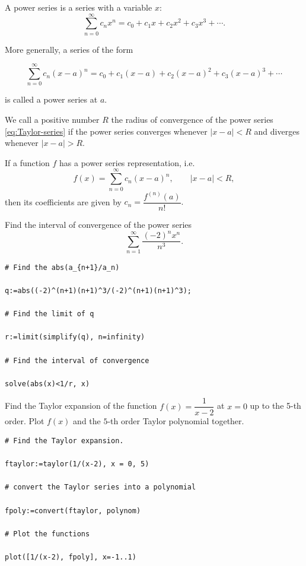\documentclass[en,11pt,simple]{elegantbook}
\let\BeginKnitrBlock\begin \let\EndKnitrBlock\end
\begin{document}
A power series is a series with a variable \(x\):
\[
\sum\limits_{n=0}^{\infty} c_nx^n=c_0+c_1x+c_2x^2+c_3x^3+\cdots.
\]

More generally, a series of the form

\begin{equation}
\sum\limits_{n=0}^{\infty} c_n(x-a)^n=c_0+c_1(x-a)+c_2(x-a)^2+c_3(x-a)^3+\cdots
\label{eq:Taylor-series}
\end{equation}

is called a power series at \(a\).

We call a positive number \(R\) the radius of convergence of the power series \eqref{eq:Taylor-series} if the power series converges whenever \(\left|x-a\right|<R\) and diverges whenever \(\left|x-a\right|>R\).

If a function \(f\) has a power series representation, i.e.
\[
f(x)=\sum_{n=0}^\infty c_n(x-a)^n,\quad\quad \left|x-a\right|<R,
\]
then its coefficients are given by \(c_n=\dfrac{f^{(n)}(a)}{n!}.\)

\BeginKnitrBlock{example}{}{}
\protect\hypertarget{exm:unnamed-chunk-230}{}{\label{exm:unnamed-chunk-230} }
Find the interval of convergence of the power series
\[
\sum\limits_{n=1}^{\infty}\dfrac{(-2)^nx^n}{n^3}.
\]
\EndKnitrBlock{example}

\BeginKnitrBlock{solution}{}{}
{}

\begin{verbatim}
# Find the abs(a_{n+1}/a_n)

q:=abs((-2)^(n+1)(n+1)^3/(-2)^(n+1)(n+1)^3);

# Find the limit of q

r:=limit(simplify(q), n=infinity)

# Find the interval of convergence

solve(abs(x)<1/r, x)
\end{verbatim}
\EndKnitrBlock{solution}

\BeginKnitrBlock{example}{}{}
\protect\hypertarget{exm:unnamed-chunk-232}{}{\label{exm:unnamed-chunk-232} }
Find the Taylor expansion of the function \(f(x)=\dfrac{1}{x-2}\) at \(x=0\) up to the 5-th order. Plot \(f(x)\) and the \(5\)-th order Taylor polynomial together.
\EndKnitrBlock{example}

\BeginKnitrBlock{solution}{}{}
{}

\begin{verbatim}
# Find the Taylor expansion.

ftaylor:=taylor(1/(x-2), x = 0, 5)

# convert the Taylor series into a polynomial

fpoly:=convert(ftaylor, polynom)

# Plot the functions

plot([1/(x-2), fpoly], x=-1..1)
\end{verbatim}
\EndKnitrBlock{solution}
\end{document}
